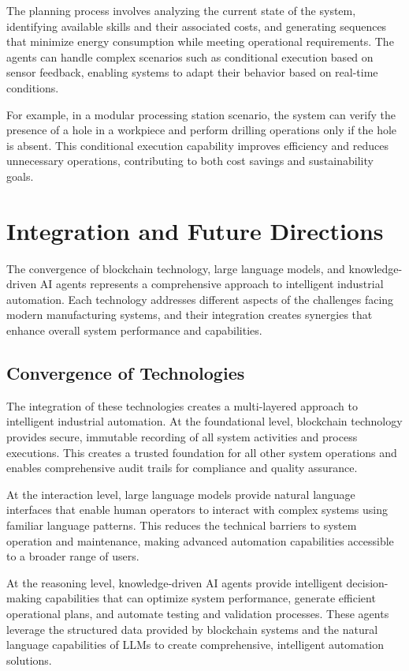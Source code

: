 The planning process involves analyzing the current state of the system, identifying available skills and their associated costs, and generating sequences that minimize energy consumption while meeting operational requirements. The agents can handle complex scenarios such as conditional execution based on sensor feedback, enabling systems to adapt their behavior based on real-time conditions.

For example, in a modular processing station scenario, the system can verify the presence of a hole in a workpiece and perform drilling operations only if the hole is absent. This conditional execution capability improves efficiency and reduces unnecessary operations, contributing to both cost savings and sustainability goals.

\section{Integration and Future Directions}

The convergence of blockchain technology, large language models, and knowledge-driven AI agents represents a comprehensive approach to intelligent industrial automation. Each technology addresses different aspects of the challenges facing modern manufacturing systems, and their integration creates synergies that enhance overall system performance and capabilities.

\subsection{Convergence of Technologies}

The integration of these technologies creates a multi-layered approach to intelligent industrial automation. At the foundational level, blockchain technology provides secure, immutable recording of all system activities and process executions. This creates a trusted foundation for all other system operations and enables comprehensive audit trails for compliance and quality assurance.

At the interaction level, large language models provide natural language interfaces that enable human operators to interact with complex systems using familiar language patterns. This reduces the technical barriers to system operation and maintenance, making advanced automation capabilities accessible to a broader range of users.

At the reasoning level, knowledge-driven AI agents provide intelligent decision-making capabilities that can optimize system performance, generate efficient operational plans, and automate testing and validation processes. These agents leverage the structured data provided by blockchain systems and the natural language capabilities of LLMs to create comprehensive, intelligent automation solutions.

